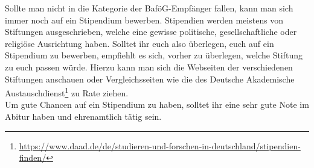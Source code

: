 Sollte man nicht in die Kategorie der BaföG-Empfänger fallen, kann man sich immer noch auf ein Stipendium bewerben. Stipendien werden meistens von Stiftungen ausgeschrieben, welche eine gewisse politische, gesellschaftliche oder religiöse Ausrichtung haben. Solltet ihr euch also überlegen, euch auf ein Stipendium zu bewerben, empfiehlt es sich, vorher zu überlegen, welche Stiftung zu euch passen würde. Hierzu kann man sich die Webseiten der verschiedenen Stiftungen anschauen oder Vergleichsseiten wie die des Deutsche Akademische Austauschdienst\footnote{\url{https://www.daad.de/de/studieren-und-forschen-in-deutschland/stipendien-finden/}} zu Rate ziehen. \medskip \\	%
Um gute Chancen auf ein Stipendium zu haben, solltet ihr eine sehr gute Note im Abitur haben und ehrenamtlich tätig sein.
